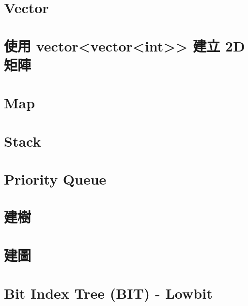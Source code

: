 \documentclass{article}
\begin{document}
\begin{multicols}{2}

\section{Vector}




\section{使用 vector<vector<int>> 建立 2D 矩陣}



\section{Map}



\section{Stack}



\section{Priority Queue}



\section{建樹}



\section{建圖}



\section{Bit Index Tree (BIT) - Lowbit}


\end{multicols}
\end{document}

